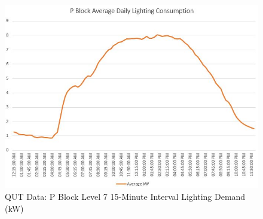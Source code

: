 \begin{figure}[H]
	\hfill\includegraphics[width = 150mm]{images/metering/pme/pblock-lvl7-daily-avg-kw}\hspace*{\fill}
	\caption{QUT Data: P Block Level 7 15-Minute Interval Lighting Demand (kW)} 
	\label{fig:pblock-lvl7-15-minute}
\end{figure}

\newpage